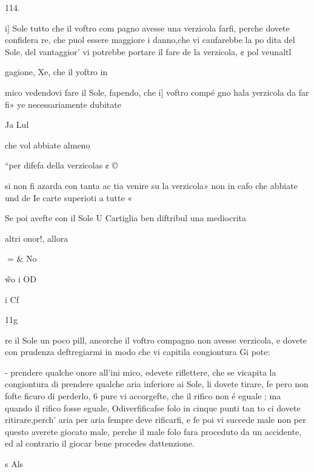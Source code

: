 \documentclass[12pt,a6paper]{article}
\begin{document}
 

 

 

 

 

 

 

114.

i] Sole tutto che il voftro com
pagno avesse una verzicola
farfi, perche dovete confidera
re, che puol essere maggiore i
danno,che vi caufarebbe la po
dita del Sole, del vantaggior’
vi potrebbe portare il fare de
la verzicola, ¢ pol veunaltl

gagione, Xe, che il yoftro in

mico vedendovi fare il Sole,
fapendo, che i] voftro compé
gno hala yerzicola da far fi»
ye necessariamente dubitate

Ja Lul

che vol abbiate almeno

“per difefa della verzicolas ¢ ©

si non fi azarda con tanta ac
tia venire su la verzicola»
non in cafo che abbiate und de
Ie carte superioti a tutte «

Se poi avefte con il Sole U
Cartiglia ben diftribul
una mediocrita

altri onor!, allora

 
= & No

\~ wo i OD

i
Cf

11g

re il Sole un poco pill, ancorche
il voftro compagno non avesse
verzicola, e dovete con prudenza deftregiarmi in modo che
vi capitila congiontura Gi pote:

- prendere qualche onore all’ini
mico, edevete riflettere, che
se vicapita la congiontura di
prendere qualche aria inferiore
ai Sole, li dovete tirare, fe pero non fofte ficuro di perderlo,
6 pure vi accorgefte, che il
rifico non é eguale ; ma quando
il rifico fosse eguale, Odiverfificafse folo in cinque punti tan
to ci dovete ritirare,perch’ aria
per aria fempre deve rificarfi, e
fe poi vi succede male non per
questo averete giocato male,
perche il male folo fara proceduto da un accidente, ed al contrario il giocar bene procedes
dattenzione.

s Als

 

 

 

 
 

 
\end{document}
